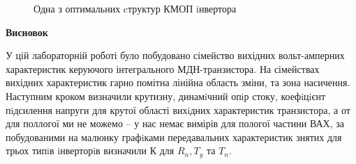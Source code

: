 \documentclass[a4paper,14pt]{extreport}
\begin{document}
\newpage
\begin{figure}[h]
\caption{ Одна з оптимальних cтруктур КМОП iнвертора}
\end{figure}



\begin{center}
 \textbf{Висновок}
\end{center}

У цій лабораторній роботі було побудовано сімейство вихідних вольт-амперних характеристик керуючого інтегрального МДН-транзистора.  На сімействах вихідних характеристик 
гарно помітна лінійна область зміни, та зона насичення.
Наступним кроком визначили крутизну, динамiчний опiр стоку, коефiцiєнт пiдсилення напруги для крутої області вихiдних характеристик транзистора, а от для поллогої ми не можемо -- у нас немає вимірів для пологої частини ВАХ, за побудованими на малюнку графiками передавальних характеристик знятих для трьох типiв iнверторiв визначили К для $R_{n}, T_{y} $ та  $ T_{n}$.
\end{document}
